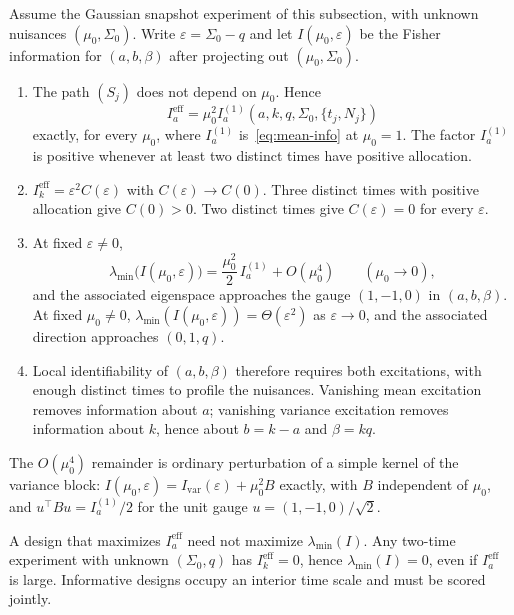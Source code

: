 \documentclass[anon,11pt]{alt2027}
\begin{document}
\begin{proposition}
\label{prop:geometry}
Assume the Gaussian snapshot experiment of this subsection, with unknown
nuisances $(\mu_0,\Sigma_0)$. Write $\varepsilon=\Sigma_0-q$ and let
$I(\mu_0,\varepsilon)$ be the Fisher information for $(a,b,\beta)$ after
projecting out $(\mu_0,\Sigma_0)$.
\begin{enumerate}
\item[(i)] The path $(S_j)$ does not depend on $\mu_0$. Hence
\begin{equation}
\label{eq:ia-factor}
I_a^{\mathrm{eff}}
=\mu_0^2 I_a^{(1)}(a,k,q,\Sigma_0,\{t_j,N_j\})
\end{equation}
exactly, for every $\mu_0$, where $I_a^{(1)}$ is~\eqref{eq:mean-info} at
$\mu_0=1$. The factor $I_a^{(1)}$ is positive whenever at least two distinct
times have positive allocation.
\item[(ii)] $I_k^{\mathrm{eff}}=\varepsilon^2 C(\varepsilon)$ with
$C(\varepsilon)\to C(0)$. Three distinct times with positive allocation give
$C(0)>0$. Two distinct times give $C(\varepsilon)=0$ for every $\varepsilon$.
\item[(iii)] At fixed $\varepsilon\neq 0$,
\[
\lambda_{\min}\bigl(I(\mu_0,\varepsilon)\bigr)
=\frac{\mu_0^2}{2}\,I_a^{(1)}+O(\mu_0^4)
\qquad(\mu_0\to 0),
\]
and the associated eigenspace approaches the gauge $(1,-1,0)$ in
$(a,b,\beta)$. At fixed $\mu_0\neq 0$,
$\lambda_{\min}(I(\mu_0,\varepsilon))=\Theta(\varepsilon^2)$ as
$\varepsilon\to 0$, and the associated direction approaches $(0,1,q)$.
\item[(iv)] Local identifiability of $(a,b,\beta)$ therefore requires both
excitations, with enough distinct times to profile the nuisances. Vanishing
mean excitation removes information about $a$; vanishing variance excitation
removes information about $k$, hence about $b=k-a$ and $\beta=kq$.
\end{enumerate}
\end{proposition}

The $O(\mu_0^4)$ remainder is ordinary perturbation of a simple kernel of the
variance block: $I(\mu_0,\varepsilon)=I_{\mathrm{var}}(\varepsilon)+\mu_0^2 B$
exactly, with $B$ independent of $\mu_0$, and
$u^\top B u=I_a^{(1)}/2$ for the unit gauge $u=(1,-1,0)/\sqrt 2$.

\begin{corollary}
\label{cor:joint-design}
A design that maximizes $I_a^{\mathrm{eff}}$ need not maximize
$\lambda_{\min}(I)$. Any two-time experiment with unknown $(\Sigma_0,q)$ has
$I_k^{\mathrm{eff}}=0$, hence $\lambda_{\min}(I)=0$, even if
$I_a^{\mathrm{eff}}$ is large. Informative designs occupy an interior time
scale and must be scored jointly.
\end{corollary}
\end{document}
